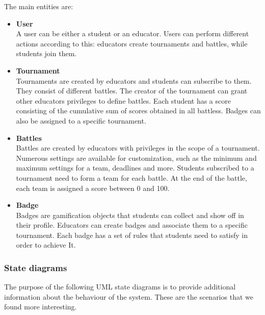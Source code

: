 The main entities are:
\begin{itemize}
    \item \textbf{User}\\
        A user can be either a student or an educator. Users can perform different actions according to this: educators create tournaments and battles, while students join them.
    \item \textbf{Tournament}\\
        Tournaments are created by educators and students can subscribe to them. They consist of different battles. The creator of the tournament can grant other educators privileges to define battles. Each student has a score consisting of the cumulative sum of scores obtained in all battless. Badges can also be assigned to a specific tournament.
    \item \textbf{Battles}\\
        Battles are created by educators with privileges in the scope of a tournament. Numerous settings are available for customization, such as the minimum and maximum settings for a team, deadlines and more. Students subscribed to a tournament need to form a team for each battle. At the end of the battle, each team is assigned a score between 0 and 100.
    \item \textbf{Badge}\\
        Badges are gamification objects that students can collect and show off in their profile. Educators can create badges and associate them to a specific tournament. Each badge has a set of rules that students need to satisfy in order to achieve It.
\end{itemize}

\subsubsection{State diagrams}
The purpose of the following UML state diagrams is to provide additional information about the behaviour of the system. These are the scenarios that we found more interesting.

